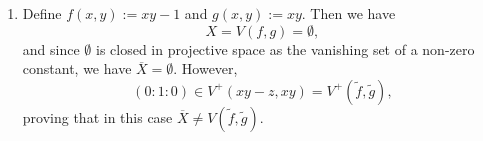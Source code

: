 \begin{exercise}{1}
\begin{enumerate}
        \item{} Define $f(x,y):=xy-1$ and $g(x,y):=xy$. Then we have 
            \begin{equation*}
                X=V(f,g)=\emptyset,
            \end{equation*}
            and since $\emptyset$ is closed in projective space as the vanishing
            set of a non-zero constant, we have $\overline{X}=\emptyset$.
            However, 
            \begin{equation*}
                (0:1:0)\in V^+(xy-z,xy)=V^+(\tilde{f}, \tilde{g}),
            \end{equation*}
            proving that in this case $\overline{X}\neq V(\tilde{f},\tilde{g})$.
\end{enumerate}
\end{exercise}

